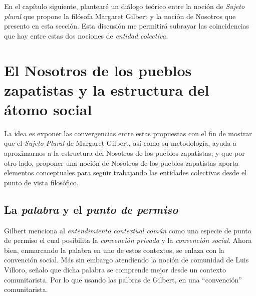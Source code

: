 \documentclass[oneside]{book}
\begin{document}
En el capítulo siguiente, plantearé un diálogo teórico entre la noción de \textit{Sujeto plural} que propone la filósofa Margaret Gilbert y la noción de Nosotros que presento en esta sección. Esta discusión me permitirá subrayar las coincidencias que hay entre estas dos nociones de \textit{entidad colectiva}.

\chapter{El Nosotros de los pueblos zapatistas y la estructura del átomo social}

La idea es exponer las convergencias entre estas propuestas con el fin de mostrar que el \textit{Sujeto Plural} de Margaret Gilbert, así como su metodología, ayuda a aproximarnos a la estructura del Nosotros de los pueblos zapatistas; y que por otro lado, proponer una  noción de Nosotros de los pueblos zapatistas aporta elementos conceptuales para seguir trabajando las entidades colectivas desde el punto de vista filosófico.

\section{La \textit{palabra} y el \textit{punto de permiso}}
	
Gilbert menciona al \textit{entendimiento contextual común} como una especie de punto de permiso el cual posibilita la \textit{convención privada} y la \textit{convención social}. Ahora bien, enmarcando la palabra en uno de estos contextos, se enlaza con la convención social. Más sin embargo atendiendo la noción de comunidad de Luis Villoro, señalo que dicha palabra se comprende mejor desde un contexto comunitarista. Por lo que usando las palbras de Gilbert, en una “convención” comunitarista.
\end{document}
